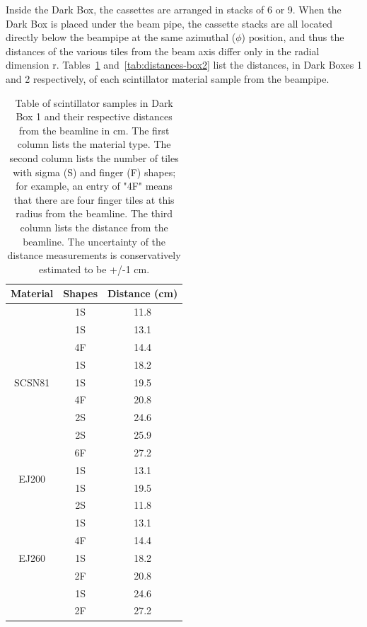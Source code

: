 Inside the Dark Box, the cassettes are arranged in stacks of 6 or 9. When the Dark Box is placed under the beam pipe, the cassette stacks are all located directly below the beampipe at the same azimuthal ($\phi$) position, and thus the distances of the various tiles from the beam axis differ only in the radial dimension r. Tables~\ref{tab:distances-box1} and~\ref{tab:distances-box2} list the distances, in Dark Boxes 1 and 2 respectively, of each scintillator material sample from the beampipe.

\begin{table}
\begin{center}
\begin{tabular}{|c|c|c|}
\hline
Material & Shapes & Distance (cm) \\
\hline
\multirow{9}{*}{SCSN81} & 1S & 11.8 \\
& 1S & 13.1 \\
& 4F & 14.4 \\
& 1S & 18.2 \\
& 1S & 19.5 \\
& 4F & 20.8 \\
& 2S & 24.6 \\
& 2S & 25.9 \\
& 6F & 27.2 \\
\hline
\multirow{2}{*}{EJ200} & 1S & 13.1 \\
& 1S & 19.5 \\
\hline
\multirow{7}{*}{EJ260} & 2S & 11.8 \\
& 1S & 13.1 \\
& 4F & 14.4 \\
& 1S & 18.2 \\
& 2F & 20.8 \\
& 1S & 24.6 \\
& 2F & 27.2 \\
\hline
\end{tabular}
\caption{Table of scintillator samples in Dark Box 1 and their respective distances from the beamline in cm. The first column lists the material type. The second column lists the number of tiles with sigma (S) and finger (F) shapes; for example, an entry of "4F" means that there are four finger tiles at this radius from the beamline. The third column lists the distance from the beamline. The uncertainty of the distance measurements is conservatively estimated to be +/-1 cm.}
\label{tab:distances-box1}
\end{center}
\end{table}

